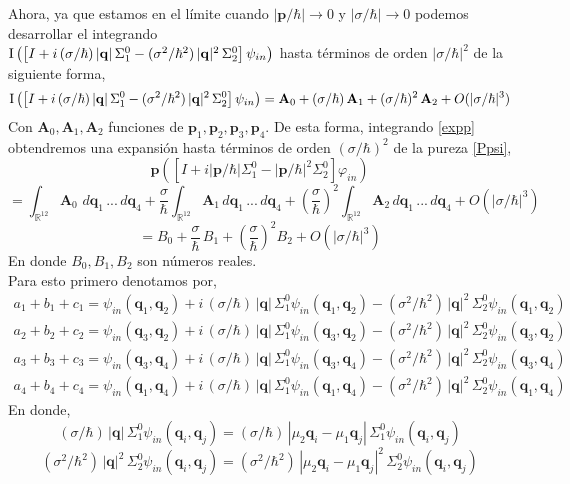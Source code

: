 \documentclass[12pt]{book}
\numberwithin{equation}{chapter}
\def\v{\mathbf}
\def\n{\noindent}
\def\R{\mathbb{R}}
\def\I{\hbox{I}}
\def\vp{\varphi}
\def\P{\mathbf{p}}
\def\A{\mathbf{A}}
\begin{document}
\n Ahora, ya que estamos en el l\'imite cuando $ |\P/\hbar|\rightarrow 0 $ y $|\sigma/\hbar|\rightarrow 0$ podemos desarrollar el integrando\\
$\I \left( \left[I + i\, (\sigma/\hbar)\, |\v{q}|\, \Sigma_{1}^{0} - (\sigma^{2}/\hbar^{2})\, |\v{q}|^{2} \, \Sigma_{2}^{0} \right] \psi_{in} \right)$ hasta t\'erminos de orden $ |\sigma/\hbar|^{2} $ de la siguiente forma,
\begin{equation}\label{expp}
\I \left( \left[I + i\, (\sigma/\hbar)\, |\v{q}|\, \Sigma_{1}^{0} - (\sigma^{2}/\hbar^{2})\, |\v{q}|^{2} \, \Sigma_{2}^{0} \right] \psi_{in} \right)=\A_{0} + (\sigma/\hbar)\, \A_{1} + (\sigma/\hbar)^{2}\, \A_{2}+ O(|\sigma/\hbar|^{3})
\end{equation}
Con $\A_{0},\A_{1},\A_{2}$ funciones de $\P_{1},\P_{2},\P_{3},\P_{4}$. De esta forma, integrando \eqref{expp} obtendremos una expansi\'on hasta t\'erminos de orden $(\sigma/\hbar)^{2}$ de la pureza \eqref{Ppsi},
$$\P \left( \left[I + i|\P/\hbar| \Sigma_{1}^{0} - |\P/\hbar|^{2} \Sigma_{2}^{0} \right] \vp_{in} \right) $$
$$=\int_{\R^{12}} \A_{0}\,\, d\v{q}_{1}\,...\,d\v{q}_{4} + \frac{\sigma}{\hbar} \int_{\R^{12}} \A_{1} \, d\v{q}_{1}\,...\,d\v{q}_{4}+
\left(\frac{\sigma}{\hbar} \right)^{2} \int_{\R^{12}} \A_{2} \, d\v{q}_{1}\,...\,d\v{q}_{4}+O(|\sigma/\hbar|^{3}) $$
\begin{equation}\label{pb}
= B_{0}  + \frac{\sigma}{\hbar}\, B_{1} +
\left(\frac{\sigma}{\hbar} \right)^{2} B_{2} + O(|\sigma/\hbar|^{3})
\end{equation}
En donde $B_{0},B_{1},B_{2}$ son n\'umeros reales.\\
\n Para esto primero denotamos por,
\begin{subequations}\label{p1-p2-p-pcm}
\begin{align}
a_{1}+b_{1}+c_{1}= \psi_{in}(\v{q}_{1},\v{q}_{2}) + i\, (\sigma/\hbar)\, |\v{q}|\, \Sigma_{1}^{0}\psi_{in}(\v{q}_{1},\v{q}_{2}) -(\sigma^{2}/\hbar^{2})\, |\v{q}|^{2} \, \Sigma_{2}^{0}\psi_{in}(\v{q}_{1},\v{q}_{2}) \\
a_{2}+b_{2}+c_{2}= \psi_{in}(\v{q}_{3},\v{q}_{2}) + i\, (\sigma/\hbar)\, |\v{q}|\, \Sigma_{1}^{0}\psi_{in}(\v{q}_{3},\v{q}_{2}) -(\sigma^{2}/\hbar^{2})\, |\v{q}|^{2} \,  \Sigma_{2}^{0}\psi_{in}(\v{q}_{3},\v{q}_{2}) \\
a_{3}+b_{3}+c_{3}= \psi_{in}(\v{q}_{3},\v{q}_{4}) + i\, (\sigma/\hbar)\, |\v{q}|\, \Sigma_{1}^{0}\psi_{in}(\v{q}_{3},\v{q}_{4}) -(\sigma^{2}/\hbar^{2})\, |\v{q}|^{2} \, \Sigma_{2}^{0}\psi_{in}(\v{q}_{3},\v{q}_{4})\\
a_{4}+b_{4}+c_{4}= \psi_{in}(\v{q}_{1},\v{q}_{4}) + i\, (\sigma/\hbar)\, |\v{q}|\, \Sigma_{1}^{0}\psi_{in}(\v{q}_{1},\v{q}_{4}) -(\sigma^{2}/\hbar^{2})\, |\v{q}|^{2} \,  \Sigma_{2}^{0}\psi_{in}(\v{q}_{1},\v{q}_{4})
\end{align}
\end{subequations}
En donde,
$$ (\sigma/\hbar)\, |\v{q}|\, \Sigma_{1}^{0}\psi_{in}(\v{q}_{i},\v{q}_{j})= (\sigma/\hbar)\, |\mu_{2}\v{q}_{i}-\mu_{1}\v{q}_{j}|\, \Sigma_{1}^{0}\psi_{in}(\v{q}_{i},\v{q}_{j}) $$
$$ (\sigma^{2}/\hbar^{2})\, |\v{q}|^{2} \,  \Sigma_{2}^{0}\psi_{in}(\v{q}_{i},\v{q}_{j})=(\sigma^{2}/\hbar^{2})\, |\mu_{2}\v{q}_{i}-\mu_{1}\v{q}_{j}|^{2} \,  \Sigma_{2}^{0}\psi_{in}(\v{q}_{i},\v{q}_{j}) $$
\end{document}
